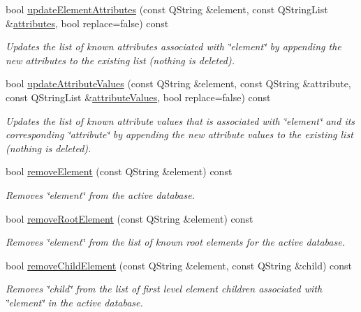 \begin{DoxyCompactItemize}
bool \hyperlink{class_g_c_data_base_interface_abc13d0cb75b233fd83575bfef575ff19}{update\-Element\-Attributes} (const \-Q\-String \&element, const \-Q\-String\-List \&\hyperlink{class_g_c_data_base_interface_afb1e49e08f98ca453f9ac66340a35642}{attributes}, bool replace=false) const 
\begin{DoxyCompactList}\small\item\em \-Updates the list of known attributes associated with \char`\"{}element\char`\"{} by appending the new attributes to the existing list (nothing is deleted). \end{DoxyCompactList}\item 
bool \hyperlink{class_g_c_data_base_interface_ae4f158875b5a8a109d301f19ce5d21ae}{update\-Attribute\-Values} (const \-Q\-String \&element, const \-Q\-String \&attribute, const \-Q\-String\-List \&\hyperlink{class_g_c_data_base_interface_a329e17f6c02c62fd554884f2b5a7e2df}{attribute\-Values}, bool replace=false) const 
\begin{DoxyCompactList}\small\item\em \-Updates the list of known attribute values that is associated with \char`\"{}element\char`\"{} and its corresponding \char`\"{}attribute\char`\"{} by appending the new attribute values to the existing list (nothing is deleted). \end{DoxyCompactList}\item 
bool \hyperlink{class_g_c_data_base_interface_ad8aa20de89390f0cc2a1b64270a831b3}{remove\-Element} (const \-Q\-String \&element) const 
\begin{DoxyCompactList}\small\item\em \-Removes \char`\"{}element\char`\"{} from the active database. \end{DoxyCompactList}\item 
bool \hyperlink{class_g_c_data_base_interface_adbace3a2d395dae9cd915238556a6f77}{remove\-Root\-Element} (const \-Q\-String \&element) const 
\begin{DoxyCompactList}\small\item\em \-Removes \char`\"{}element\char`\"{} from the list of known root elements for the active database. \end{DoxyCompactList}\item 
bool \hyperlink{class_g_c_data_base_interface_a657f2885b6741f8ac229939f77e7dd73}{remove\-Child\-Element} (const \-Q\-String \&element, const \-Q\-String \&child) const 
\begin{DoxyCompactList}\small\item\em \-Removes \char`\"{}child\char`\"{} from the list of first level element children associated with \char`\"{}element\char`\"{} in the active database. \end{DoxyCompactList}\item 

\end{DoxyCompactItemize}
